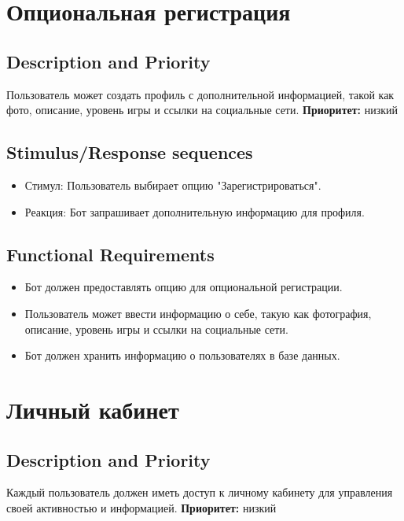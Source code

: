 \documentclass{scrreprt}
\begin{document}
\section{Опциональная регистрация}

\subsection{Description and Priority}
Пользователь может создать профиль с дополнительной информацией, такой как фото, описание, уровень игры и ссылки на социальные сети.
\newline
\textbf{Приоритет:} низкий

\subsection{Stimulus/Response sequences}
\begin{itemize}
    \item Стимул: Пользователь выбирает опцию "Зарегистрироваться".
    \item Реакция: Бот запрашивает дополнительную информацию для профиля.
\end{itemize}

\subsection{Functional Requirements}
\begin{itemize}
    \item Бот должен предоставлять опцию для опциональной регистрации.
    \item Пользователь может ввести информацию о себе, такую как фотография, описание, уровень игры и ссылки на социальные сети.
    \item Бот должен хранить информацию о пользователях в базе данных.
\end{itemize}

\section{Личный кабинет}

\subsection{Description and Priority}
Каждый пользователь должен иметь доступ к личному кабинету для управления своей активностью и информацией.
\newline
\textbf{Приоритет:} низкий
\end{document}
